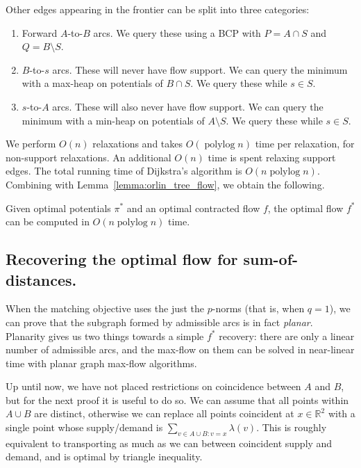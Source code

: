 \documentclass[a4paper,UKenglish]{socg-lipics-v2018}
\def\polylog{\mathop{\mathrm{polylog}}}
\def\reals{\mathbb{R}}
\def\tsupply{\lambda}
\theoremstyle{plain}
\numberwithin{figure}{section}
\begin{document}
\begin{toappendix}
Other edges appearing in the frontier can be split into three categories:
\begin{enumerate}
\item Forward $A$-to-$B$ arcs.
	We query these using a BCP with $P = A \cap S$ and $Q = B \setminus S$.
\item $B$-to-$s$ arcs.
	These will never have flow support.
	We can query the minimum with a max-heap on potentials of $B \cap S$.
	We query these while $s \in S$.
\item $s$-to-$A$ arcs.
	These will also never have flow support.
	We can query the minimum with a min-heap on potentials of $A \setminus S$.
	We query these while $s \in S$.
\end{enumerate}
We perform $O(n)$ relaxations and takes $O(\polylog n)$ time per relaxation,
for non-support relaxations.
An additional $O(n)$ time is spent relaxing support edges.
The total running time of Dijkstra's algorithm is $O(n\polylog n)$.
Combining with Lemma~\ref{lemma:orlin_tree_flow}, we obtain the following.

\begin{lemma}
Given optimal potentials $\pi^*$ and an optimal contracted flow $f$, the
optimal flow $f^*$ can be computed in $O(n\polylog n)$ time.
\end{lemma}

\subsection{Recovering the optimal flow for sum-of-distances.}
\label{SSA:flow-recovery-planar}

When the matching objective uses the just the $p$-norms (that is, when $q=1$), we can prove that
the subgraph formed by admissible arcs is in fact \emph{planar}.
Planarity gives us two things towards a simple $f^*$ recovery:
there are only a linear number of admissible arcs, and the max-flow on them can
be solved in near-linear time with planar graph max-flow algorithms.

Up until now, we have not placed restrictions on coincidence between $A$ and $B$,
but for the next proof it is useful to do so.
We can assume that all points within $A \cup B$ are distinct, otherwise we can
replace all points coincident at $x \in \reals^2$ with a single point whose
supply/demand is $\sum_{v \in A \cup B: v=x}\tsupply(v)$.
This is roughly equivalent to transporting as much as we can between
coincident supply and demand, and is optimal by triangle inequality.


\end{toappendix}
\end{document}
